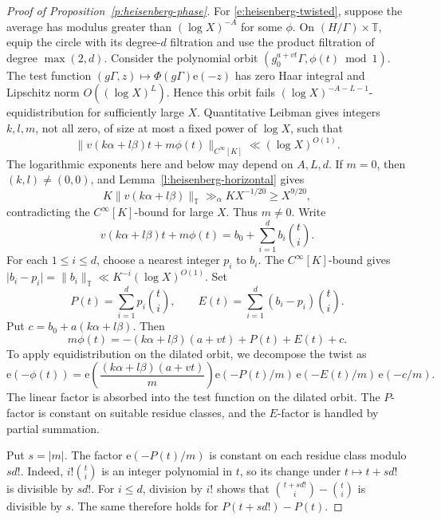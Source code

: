 \documentclass[12pt]{amsart}
\newcommand{\1}{\mathbf 1}
\newcommand{\e}{\mathrm e}
\theoremstyle{definition}
\begin{document}
\begin{proof}[Proof of Proposition~\ref{p:heisenberg-phase}]
For \eqref{e:heisenberg-twisted}, suppose the average has modulus
greater than \((\log X)^{-A}\) for some \(\phi\). On
\((H/\Gamma)\times\mathbb T\), equip the circle with its degree-\(d\)
filtration and use the product filtration of degree \(\max(2,d)\).
Consider the polynomial orbit
\((g_0^{a+vt}\Gamma,\phi(t)\bmod 1)\). The test function
\((g\Gamma,z)\mapsto\Phi(g\Gamma)\e(-z)\) has zero Haar integral
and Lipschitz norm \(O((\log X)^L)\). Hence this orbit fails
\((\log X)^{-A-L-1}\)-equidistribution for sufficiently large \(X\).
Quantitative Leibman gives integers \(k,l,m\), not all zero,
of size at most a fixed power of \(\log X\), such that
\[
 \|v(k\alpha+l\beta)t+m\phi(t)\|_{C^\infty[K]}
 \ll(\log X)^{O(1)}.
\]
The logarithmic exponents here and below may depend on \(A,L,d\).
If \(m=0\), then \((k,l)\ne(0,0)\), and
Lemma~\ref{l:heisenberg-horizontal} gives
\[
 K\|v(k\alpha+l\beta)\|_{\mathbb T}
 \gg_\alpha KX^{-1/20}\geq X^{9/20},
\]
contradicting the \(C^\infty[K]\)-bound for large \(X\).
Thus \(m\ne0\).
Write
\[
 v(k\alpha+l\beta)t+m\phi(t)
 =b_0+\sum_{i=1}^d b_i\binom{t}{i}.
\]
For each \(1\leq i\leq d\), choose a nearest integer \(p_i\) to
\(b_i\). The \(C^\infty[K]\)-bound gives
\(\lvert b_i-p_i\rvert=\|b_i\|_{\mathbb T}
\ll K^{-i}(\log X)^{O(1)}\). Set
\[
 P(t)=\sum_{i=1}^d p_i\binom{t}{i},
 \qquad
 E(t)=\sum_{i=1}^d(b_i-p_i)\binom{t}{i}.
\]
Put $c=b_0+a(k\alpha+l\beta)$. Then
\[
 m\phi(t)=-(k\alpha+l\beta)(a+vt)+P(t)+E(t)+c.
\]
To apply equidistribution on the dilated orbit, we decompose the
twist as
\[
 \e(-\phi(t))
 =\e\!\left(\frac{(k\alpha+l\beta)(a+vt)}{m}\right)
  \e(-P(t)/m)\,\e(-E(t)/m)\,\e(-c/m).
\]
The linear factor is absorbed into the test function on the
dilated orbit. The \(P\)-factor is constant on suitable residue
classes, and the \(E\)-factor is handled by partial summation. 

Put \(s=|m|\). The factor \(\e(-P(t)/m)\) is constant on each
residue class modulo \(sd!\). Indeed, \(i!\binom{t}{i}\) is an
integer polynomial in \(t\), so its change under \(t\mapsto t+sd!\)
is divisible by \(sd!\). For \(i\leq d\), division by \(i!\) shows
that \(\binom{t+sd!}{i}-\binom{t}{i}\) is divisible by \(s\).
The same therefore holds for \(P(t+sd!)-P(t)\).


\end{proof}
\end{document}
